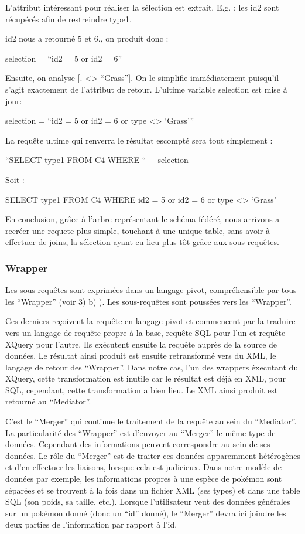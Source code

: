 L’attribut intéressant pour réaliser la sélection est extrait. E.g. : les id2 sont récupérés afin de restreindre type1.

id2 nous a retourné 5 et 6., on produit donc :

selection = “id2 = 5 or id2 = 6”

Ensuite, on analyse [. <> “Grass”]. On le simplifie immédiatement puisqu’il s’agit exactement de l’attribut de retour. L’ultime variable selection est mise à jour:

selection = “id2 = 5 or id2 = 6 or type <> ‘Grass’”

La requête ultime qui renverra le résultat escompté sera tout simplement :

“SELECT type1 FROM C4 WHERE “ + selection

Soit :

SELECT type1 FROM C4 WHERE id2 = 5 or id2 = 6 or type <> ‘Grass’

En conclusion, grâce à l’arbre représentant le schéma fédéré, nous arrivons a recréer une requete plus simple, touchant à une unique table,  sans avoir à effectuer de joins, la sélection ayant eu lieu plus tôt grâce aux sous-requêtes.

\subsubsection{Wrapper}

Les sous-requêtes sont exprimées dans un langage pivot, compréhensible par tous les “Wrapper” (voir 3) b) ). Les sous-requêtes sont poussées vers les “Wrapper”.

Ces derniers reçoivent la requête en langage pivot et commencent par la traduire vers un langage de requête propre à la base, requête SQL pour l’un et requête XQuery pour l’autre. Ils exécutent ensuite la requête auprès de la source de données. Le résultat ainsi produit est ensuite retransformé vers du XML, le langage de retour des “Wrapper”. Dans notre cas, l’un des wrappers éxecutant du XQuery, cette transformation est inutile car le résultat est déjà en XML, pour SQL, cependant, cette transformation a bien lieu. Le XML ainsi produit est retourné au “Mediator”.

C’est le “Merger” qui continue le traitement de la requête au sein du “Mediator”. La particularité des “Wrapper” est d’envoyer au “Merger” le même type de données. Cependant des informations peuvent correspondre au sein de ses données. Le rôle du “Merger” est de traiter ces données apparemment hétérogènes et d’en effectuer les liaisons, lorsque cela est judicieux. Dans notre modèle de données par exemple, les informations propres à une espèce de pokémon sont séparées et se trouvent à la fois dans un fichier XML (ses types) et dans une table SQL (son poids, sa taille, etc.). Lorsque l’utilisateur veut des données générales sur un pokémon donné (donc un “id” donné), le “Merger” devra ici joindre les deux parties de l’information par rapport à l’id. 

